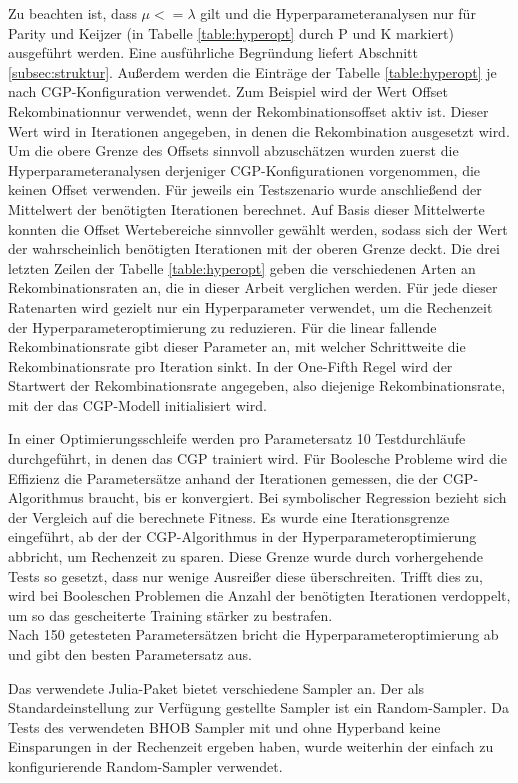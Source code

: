 Zu beachten ist, dass $\mu <= \lambda$ gilt und die Hyperparameteranalysen nur für Parity und Keijzer (in Tabelle \ref{table:hyperopt} durch P und K markiert) ausgeführt werden.
Eine ausführliche Begründung liefert Abschnitt \ref{subsec:struktur}.
Außerdem werden die Einträge der Tabelle \ref{table:hyperopt} je nach CGP-Konfiguration verwendet.
Zum Beispiel wird der Wert \glqq Offset Rekombination\grqq\space nur verwendet, wenn der Rekombinationsoffset aktiv ist. 
Dieser Wert wird in Iterationen angegeben, in denen die Rekombination ausgesetzt wird.
Um die obere Grenze des Offsets sinnvoll abzuschätzen wurden zuerst die Hyperparameteranalysen derjeniger CGP-Konfigurationen vorgenommen, die keinen Offset verwenden.
Für jeweils ein Testszenario wurde anschließend der Mittelwert der benötigten Iterationen berechnet.
Auf Basis dieser Mittelwerte konnten die Offset Wertebereiche sinnvoller gewählt werden, sodass sich der Wert der wahrscheinlich benötigten Iterationen mit der oberen Grenze deckt.
Die drei letzten Zeilen der Tabelle \ref{table:hyperopt} geben die verschiedenen Arten an Rekombinationsraten an, die in dieser Arbeit verglichen werden.
Für jede dieser Ratenarten wird gezielt nur ein Hyperparameter verwendet, um die Rechenzeit der Hyperparameteroptimierung zu reduzieren.
Für die linear fallende Rekombinationsrate gibt dieser Parameter an, mit welcher Schrittweite die Rekombinationsrate pro Iteration sinkt.
In der One-Fifth Regel wird der Startwert der Rekombinationsrate angegeben, also diejenige Rekombinationsrate, mit der das CGP-Modell initialisiert wird.

In einer Optimierungsschleife werden pro Parametersatz 10 Testdurchläufe durchgeführt, in denen das CGP trainiert wird.
Für Boolesche Probleme wird die Effizienz die Parametersätze anhand der Iterationen gemessen, die der CGP-Algorithmus braucht, bis er konvergiert.
Bei symbolischer Regression bezieht sich der Vergleich auf die berechnete Fitness.
Es wurde eine Iterationsgrenze eingeführt, ab der der CGP-Algorithmus in der Hyperparameteroptimierung abbricht, um Rechenzeit zu sparen.
Diese Grenze wurde durch vorhergehende Tests so gesetzt, dass nur wenige Ausreißer diese überschreiten.
Trifft dies zu, wird bei Booleschen Problemen die Anzahl der benötigten Iterationen verdoppelt, um so das gescheiterte Training stärker zu bestrafen.\\
Nach 150 getesteten Parametersätzen bricht die Hyperparameteroptimierung ab und gibt den besten Parametersatz aus.

Das verwendete Julia-Paket bietet verschiedene Sampler an.
Der als Standardeinstellung zur Verfügung gestellte Sampler ist ein Random-Sampler.
Da Tests des verwendeten BHOB Sampler mit und ohne Hyperband keine Einsparungen in der Rechenzeit ergeben haben, wurde weiterhin der einfach zu konfigurierende Random-Sampler verwendet. 

